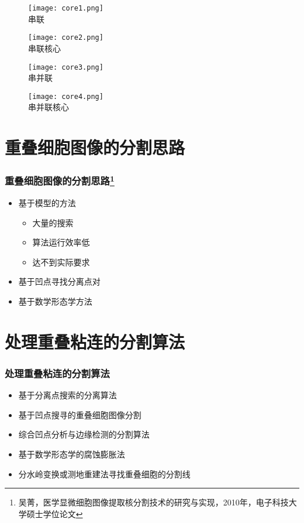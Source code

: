 \documentclass[notheorems,mathserif,table,compress]{beamer}  %
\begin{document}
\begin{frame}
  \begin{figure}
   \begin{minipage}[t]{0.4\textwidth} 
     \centering 
     \texttt{[image: core1.png]} \\
     串联
   \end{minipage}
   \begin{minipage}[t]{0.4\textwidth} 
     \centering 
     \texttt{[image: core2.png]} \\
     串联核心
   \end{minipage}
   \begin{minipage}[b]{0.4\textwidth} 
     \centering 
     \texttt{[image: core3.png]} \\
     串并联
   \end{minipage}
   \begin{minipage}[b]{0.4\textwidth} 
     \centering 
     \texttt{[image: core4.png]} \\
     串并联核心
   \end{minipage}
   \end{figure}
\end{frame}




\section{重叠细胞图像的分割思路}
\begin{frame}
   \frametitle{重叠细胞图像的分割思路\footnote{吴菁，医学显微细胞图像提取核分割技术的研究与实现，2010年，电子科技大学硕士学位论文}}
   \begin{itemize}
   \item 基于模型的方法
         \begin{itemize}
         \item 大量的搜索
         \item 算法运行效率低
         \item 达不到实际要求
         \end{itemize}
   \item 基于凹点寻找分离点对
   \item 基于数学形态学方法 
   \end{itemize}
\end{frame}



\section{处理重叠粘连的分割算法}
\begin{frame}
  \frametitle{处理重叠粘连的分割算法}
  \begin{itemize}
  \item 基于分离点搜索的分离算法
  \item 基于凹点搜寻的重叠细胞图像分割
  \item 综合凹点分析与边缘检测的分割算法
  \item 基于数学形态学的腐蚀膨胀法
  \item 分水岭变换或测地重建法寻找重叠细胞的分割线
  \end{itemize}
\end{frame}
\end{document}
